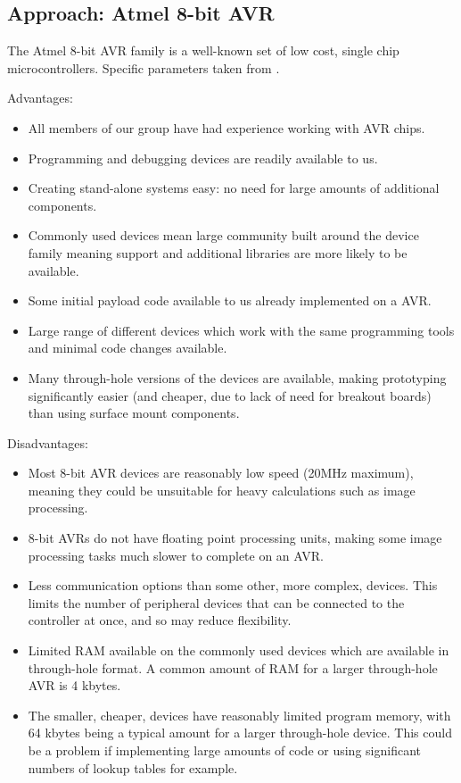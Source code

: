\subsection{Approach: Atmel 8-bit AVR}
\label{sec:desappr:avr}
The Atmel 8-bit AVR family is a well-known set of low cost, single chip microcontrollers. Specific parameters taken from \cite{megaAVR_parameters}.

Advantages:
\begin{itemize}
\item All members of our group have had experience working with AVR chips.

\item Programming and debugging devices are readily available to us.

\item Creating stand-alone systems easy: no need for large amounts of additional components.

\item Commonly used devices mean large community built around the device family meaning support and additional libraries are more likely to be available.

\item Some initial payload code available to us already implemented on a AVR.

\item Large range of different devices which work with the same programming tools and minimal code changes available.

\item Many through-hole versions of the devices are available, making prototyping significantly easier (and cheaper, due to lack of need for breakout boards) than using surface mount components.
\end{itemize}

Disadvantages:
\begin{itemize}
\item Most 8-bit AVR devices are reasonably low speed (20MHz maximum), meaning they could be unsuitable for heavy calculations such as image processing.

\item 8-bit AVRs do not have floating point processing units, making some image processing tasks much slower to complete on an AVR.

\item Less communication options than some other, more complex, devices. This limits the number of peripheral devices that can be connected to the controller at once, and so may reduce flexibility.

\item Limited RAM available on the commonly used devices which are available in through-hole format. A common amount of RAM for a larger through-hole AVR is 4 kbytes.

\item The smaller, cheaper, devices have reasonably limited program memory, with 64 kbytes being a typical amount for a larger through-hole device. This could be a problem if implementing large amounts of code or using significant numbers of lookup tables for example.
\end{itemize}
	

